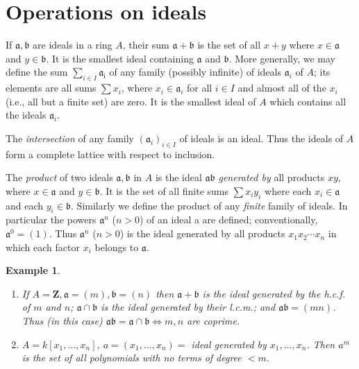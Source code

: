 \documentclass[class=book, crop=false]{standalone}
\newtheorem*{example}{Example}
\theoremstyle{definition}
\theoremstyle{remark}
\begin{document}
\section{Operations on ideals}
If $\mathfrak{a}, \mathfrak{b}$ are ideals in a ring $A$, their sum
$\mathfrak{a}+\mathfrak{b}$ is the set of all $x+y$ where $x \in \mathfrak{a}$
and $y \in \mathfrak{b}$. It is the smallest ideal containing $\mathfrak{a}$ and
$\mathfrak{b}$. More generally, we may define the sum
$\sum_{i \in I} \mathfrak{a}_{\mathfrak{i}}$ of any family (possibly infinite)
of ideals $\mathfrak{a}_{i}$ of $A$; its elements are all sums $\sum x_{i}$,
where $x_{i} \in \mathfrak{a}_{i}$ for all $i \in I$ and almost all of the
$x_{i}$ (i.e., all but a finite set) are zero. It is the smallest ideal of $A$
which contains all the ideals $\mathfrak{a}_{i}$.

The \textit{intersection} of any family
$\left(\mathfrak{a}_{i}\right)_{i \in I}$ of ideals is an ideal. Thus the ideals
of $A$ form a complete lattice with respect to inclusion.

The \textit{product} of two ideals $\mathfrak{a}, \mathfrak{b}$ in $A$ is the
ideal $\mathfrak{a} \mathfrak{b}$ \textit{generated by} all products $x y$,
where $x \in \mathfrak{a}$ and $y \in \mathfrak{b}$. It is the set of all finite
sums $\sum x_{i} y_{i}$ where each $x_{i} \in \mathfrak{a}$ and each
$y_{i} \in \mathfrak{b}$. Similarly we define the product of any \textit{finite}
family of ideals. In particular the powers $\mathfrak{a}^{n}$ ($n>0$) of an
ideal a are defined; conventionally, $\mathfrak{a}^{0}=(1)$. Thus
$\mathfrak{a}^{n}$ ($n>0$) is the ideal generated by all products
$x_{1} x_{2} \cdots x_{n}$ in which each factor $x_{i}$ belongs to
$\mathfrak{a}$.

\begin{example}
  \begin{enumerate}[1)]
    \item If $A=\mathbf{Z}, \mathfrak{a}=(m), \mathfrak{b}=(n)$ then
          $\mathfrak{a}+\mathfrak{b}$ is the ideal generated by the
          h.c.f. of $m$ and $n$;
          $\mathfrak{a} \cap \mathfrak{b}$ is the ideal generated by their
          l.c.m.; and $\mathfrak{a} \mathfrak{b}=(m n)$. Thus (in this case)
          $\mathfrak{a} \mathfrak{b}=\mathfrak{a} \cap \mathfrak{b} \iff m, n$
          are coprime.
    \item $A=k\left[x_{1}, \ldots, x_{n}\right]$,
          $a=\left(x_{1}, \ldots, x_{n}\right)=$ ideal generated by
          $x_{1}, \ldots, x_{n}$. Then $a^{m}$ is the set of all polynomials
          with no terms of degree $<m$.
  \end{enumerate}
\end{example}
\end{document}
